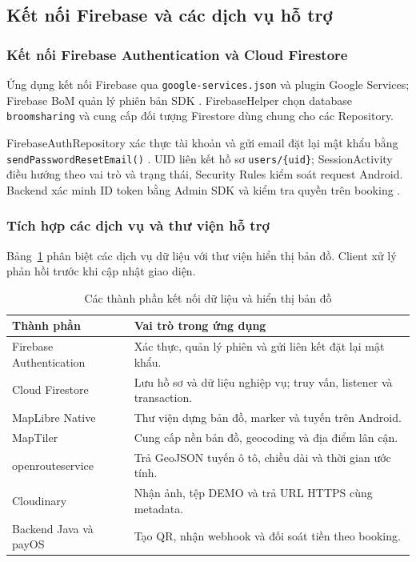 \subsection{Kết nối Firebase và các dịch vụ hỗ trợ}
\label{sec:firebase-and-services}

\subsubsection{Kết nối Firebase Authentication và Cloud Firestore}
Ứng dụng kết nối Firebase qua \texttt{google-services.json} và plugin Google Services; Firebase BoM quản lý phiên bản SDK \parencite{firebase_android}. FirebaseHelper chọn database \texttt{broomsharing} và cung cấp đối tượng Firestore dùng chung cho các Repository.

FirebaseAuthRepository xác thực tài khoản và gửi email đặt lại mật khẩu bằng \texttt{sendPasswordResetEmail()} \parencite{firebase_auth_users}. UID liên kết hồ sơ \texttt{users/\{uid\}}; SessionActivity điều hướng theo vai trò và trạng thái, Security Rules kiểm soát request Android. Backend xác minh ID token bằng Admin SDK và kiểm tra quyền trên booking \parencite{firebase_admin_token}.

\subsubsection{Tích hợp các dịch vụ và thư viện hỗ trợ}
Bảng~\ref{tab:implemented-services} phân biệt các dịch vụ dữ liệu với thư viện hiển thị bản đồ. Client xử lý phản hồi trước khi cập nhật giao diện.

\begin{table}[htbp]
\centering\small
\caption{Các thành phần kết nối dữ liệu và hiển thị bản đồ}
\label{tab:implemented-services}
\begin{tabularx}{\linewidth}{@{}p{4.1cm}X@{}}
\toprule
Thành phần & Vai trò trong ứng dụng \\
\midrule
Firebase Authentication & Xác thực, quản lý phiên và gửi liên kết đặt lại mật khẩu. \\
Cloud Firestore & Lưu hồ sơ và dữ liệu nghiệp vụ; truy vấn, listener và transaction. \\
MapLibre Native & Thư viện dựng bản đồ, marker và tuyến trên Android. \\
MapTiler & Cung cấp nền bản đồ, geocoding và địa điểm lân cận. \\
openrouteservice & Trả GeoJSON tuyến ô tô, chiều dài và thời gian ước tính. \\
Cloudinary & Nhận ảnh, tệp DEMO và trả URL HTTPS cùng metadata. \\
Backend Java và payOS & Tạo QR, nhận webhook và đối soát tiền theo booking. \\
\bottomrule
\end{tabularx}
\end{table}

